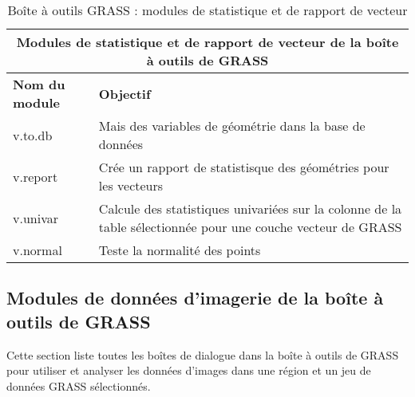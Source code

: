 \begin{table}[H]
\centering
 \begin{tabular}{|p{3cm}|p{11cm}|}
  \hline \multicolumn{2}{|c|}{\textbf{Modules de statistique et de rapport de vecteur de la boîte à outils de GRASS}} \\
  \hline \textbf{Nom du module} & \textbf{Objectif} \\
  \hline v.to.db & Mais des variables de géométrie dans la base de données\\
  \hline v.report & Crée un rapport de statistisque des géométries pour les vecteurs\\
  \hline v.univar & Calcule des statistiques univariées sur la colonne de la table sélectionnée pour une couche vecteur de GRASS\\
  \hline v.normal & Teste la normalité des points\\
\hline
\end{tabular}
\caption{Boîte à outils GRASS : modules de statistique et de rapport de vecteur}
\end{table}

\subsection{Modules de données d'imagerie de la boîte à outils de GRASS}

Cette section liste toutes les boîtes de dialogue dans la boîte à outils de GRASS pour utiliser et analyser les données d'images dans une région et un jeu de données GRASS sélectionnés.


